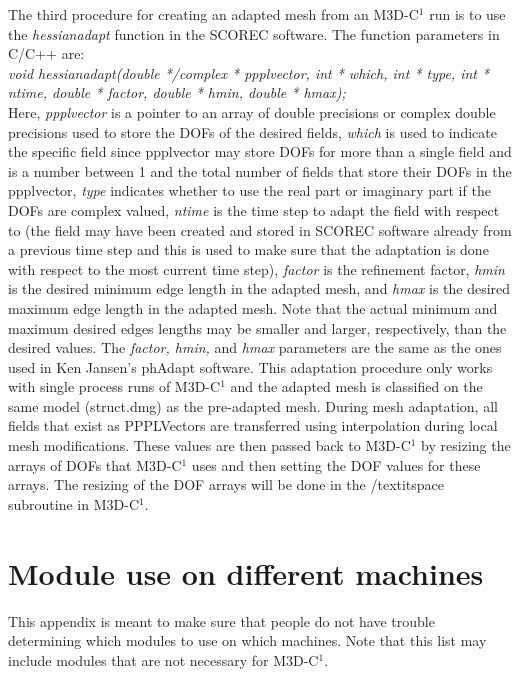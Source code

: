 The third procedure for creating an adapted mesh from an M3D-C$^1$ run is to use the 
\textit{hessianadapt} function in the SCOREC software.  The function parameters in C/C++ are:\\
\textit{void hessianadapt(double */complex * ppplvector, int * which, int * type, int * ntime, double * factor, double * hmin, double * hmax);}\\
Here, \textit{ppplvector} is a pointer to an array of double precisions or complex double precisions
used to store the DOFs of the desired fields, \textit{which} is used to indicate the specific field
since ppplvector may store DOFs for more than a single field and is a number between 1 and the total
number of fields that store their DOFs in the ppplvector, 
\textit{type} indicates whether to use the real part or imaginary part if the DOFs are complex valued, 
\textit{ntime} is the time step to adapt the field with respect to (the field may have been created
and stored in SCOREC software already from a previous time step and this is used to make sure that
the adaptation is done with respect to the most current time step),
\textit{factor} is the refinement factor, \textit{hmin} is the desired minimum edge length in the adapted mesh, 
and \textit{hmax} is the desired maximum edge length in the adapted mesh.  Note that the actual
minimum and maximum desired edges lengths may be smaller and larger, respectively, than the
desired values.  The \textit{factor, hmin,} and \textit{hmax} parameters are the same as the ones
used in Ken Jansen's phAdapt software.  This adaptation procedure only works with single process
runs of M3D-C$^1$ and the adapted mesh is classified on the same model (struct.dmg) 
as the pre-adapted mesh.  During mesh adaptation, all fields that exist as PPPLVectors are transferred
using interpolation during local mesh modifications.  These values are then passed back to M3D-C$^1$ by
resizing the arrays of DOFs that M3D-C$^1$ uses and then setting the DOF values for these arrays.  
The resizing of the DOF arrays will be done in the /textit{space} subroutine in M3D-C$^1$.


\chapter{Module use on different machines}
This appendix is meant to make sure that people do not have trouble determining which modules to use on 
which machines.  Note that this list may include modules that are not necessary for M3D-C$^1$.

